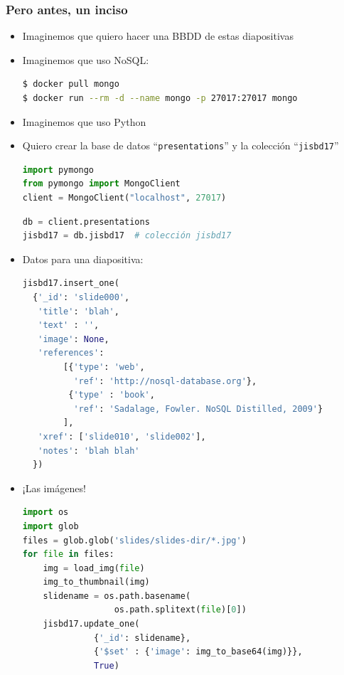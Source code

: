 \documentclass[14pt]{beamer}
\begin{document}
\begin{frame}
  \frametitle{Pero antes, un inciso}
  \begin{itemize}
  \item Imaginemos que quiero hacer una BBDD de estas diapositivas
  \item Imaginemos que uso NoSQL:
\begin{lstlisting}[language=bash]
$ docker pull mongo
$ docker run --rm -d --name mongo -p 27017:27017 mongo
\end{lstlisting}
  \item Imaginemos que uso Python

    \framebreak

  \item Quiero crear la base de datos ``{\tt presentations}'' y la colección
    ``{\tt jisbd17}''
\begin{lstlisting}[language=python]
import pymongo
from pymongo import MongoClient
client = MongoClient("localhost", 27017)
\end{lstlisting}

\begin{lstlisting}[language=python]
db = client.presentations
jisbd17 = db.jisbd17  # colección jisbd17
\end{lstlisting}

    \framebreak

\item Datos para una diapositiva:

\begin{lstlisting}[language=python]
jisbd17.insert_one(
  {'_id': 'slide000',
   'title': 'blah',
   'text' : '',
   'image': None,
   'references':
        [{'type': 'web',
          'ref': 'http://nosql-database.org'},
         {'type' : 'book',
          'ref': 'Sadalage, Fowler. NoSQL Distilled, 2009'}
        ],
   'xref': ['slide010', 'slide002'],
   'notes': 'blah blah'
  })
\end{lstlisting}

\framebreak

\item ¡Las imágenes!

\begin{lstlisting}[language=python]
import os
import glob
files = glob.glob('slides/slides-dir/*.jpg')
for file in files:
    img = load_img(file)
    img_to_thumbnail(img)
    slidename = os.path.basename(
                  os.path.splitext(file)[0])
    jisbd17.update_one(
              {'_id': slidename},
              {'$set' : {'image': img_to_base64(img)}},
              True)
\end{lstlisting}


\end{itemize}
\end{frame}
\end{document}
